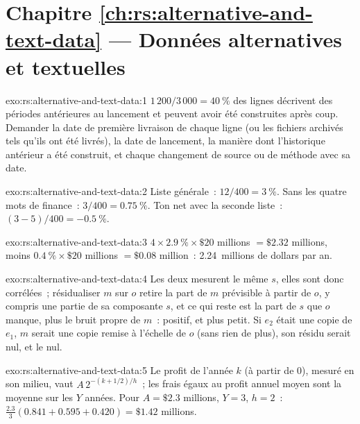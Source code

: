 \section*{Chapitre \ref{ch:rs:alternative-and-text-data} --- Données alternatives et textuelles}

\begin{solution}{exo:rs:alternative-and-text-data:1}
$1\,200/3\,000 = 40~\%$ des lignes décrivent des périodes antérieures au lancement et peuvent avoir été construites après coup. Demander la date de première livraison de
chaque ligne (ou les fichiers archivés tels qu'ils ont été livrés), la date de lancement, la manière dont l'historique antérieur a été construit, et chaque changement de source ou
de méthode avec sa date.
\end{solution}

\begin{solution}{exo:rs:alternative-and-text-data:2}
Liste générale~: $12/400 = 3~\%$. Sans les quatre mots de finance~: $3/400 = 0.75~\%$. Ton net avec la seconde liste~: $(3 - 5)/400 = -0.5~\%$.
\end{solution}

\begin{solution}{exo:rs:alternative-and-text-data:3}
$4 \times 2.9~\% \times \$20$ millions $= \$2.32$ millions, moins $0.4~\% \times \$20$ millions $= \$0.08$ million~: 2.24~millions de dollars par an.
\end{solution}

\begin{solution}{exo:rs:alternative-and-text-data:4}
Les deux mesurent le même $s$, elles sont donc corrélées~; résidualiser $m$ sur $o$ retire la part de $m$ prévisible à partir de $o$, y compris une partie de
sa composante $s$, et ce qui reste est la part de $s$ que $o$ manque, plus le bruit propre de $m$~: positif, et plus petit. Si $e_2$ était une copie de $e_1$,
$m$ serait une copie remise à l'échelle de $o$ (sans rien de plus), son résidu serait nul, et le  nul.
\end{solution}

\begin{solution}{exo:rs:alternative-and-text-data:5}
Le profit de l'année $k$ (à partir de 0), mesuré en son milieu, vaut $A\,2^{-(k+1/2)/h}$~; les frais égaux au profit annuel moyen sont la moyenne sur les
$Y$ années. Pour $A = \$2.3$ millions, $Y = 3$, $h = 2$~: $\frac{2.3}{3}(0.841 + 0.595 + 0.420) = \$1.42$ millions.
\end{solution}

